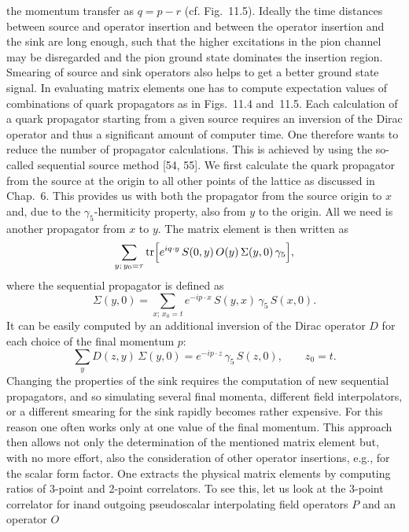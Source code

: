 the momentum transfer as $q = p - r$ (cf. Fig.~11.5). Ideally the time distances
between source and operator insertion and between the operator insertion and
the sink are long enough, such that the higher excitations in the pion channel
may be disregarded and the pion ground state dominates the insertion region.
Smearing of source and sink operators also helps to get a better ground state
signal.
In evaluating matrix elements one has to compute expectation values of
combinations of quark propagators as in Figs.~11.4 and~11.5. Each calculation
of a quark propagator starting from a given source requires an inversion of the
Dirac operator and thus a significant amount of computer time. One therefore
wants to reduce the number of propagator calculations. This is achieved by
using the so-called sequential source method [54, 55]. We first calculate the
quark propagator from the source at the origin to all other points of the
lattice as discussed in Chap.~6. This provides us with both the propagator
from the source origin to $x$ and, due to the $\gamma_5$-hermiticity property, also from
$y$ to the origin. All we need is another propagator from $x$ to $y$. The matrix
element is then written as
\begin{equation}
\sum_{y;\,y_0=\tau}
\operatorname{tr}\Bigl[e^{iq\cdot y}\, S(0, y)\, O(y)\, \Sigma(y, 0)\, \gamma_5\Bigr] ,
\end{equation}
where the sequential propagator is defined as
\begin{equation}
\Sigma(y, 0) = \sum_{x;\,x_0=t} e^{-ip\cdot x}\, S(y, x)\,\gamma_5\, S(x, 0) .
\end{equation}
It can be easily computed by an additional inversion of the Dirac operator $D$
for each choice of the final momentum $p$:
\begin{equation}
\sum_y D(z, y)\, \Sigma(y, 0) = e^{-ip\cdot z}\, \gamma_5\, S(z, 0) , \qquad z_0 = t .
\end{equation}
Changing the properties of the sink requires the computation of new sequential
propagators, and so simulating several final momenta, different field interpolators, or a different smearing for the sink rapidly becomes rather expensive.
For this reason one often works only at one value of the final momentum.
This approach then allows not only the determination of the mentioned matrix element but, with no more effort, also the consideration of other operator
insertions, e.g., for the scalar form factor.
One extracts the physical matrix elements by computing ratios of 3-point
and 2-point correlators. To see this, let us look at the 3-point correlator for inand outgoing pseudoscalar interpolating field operators $P$ and an operator $O$
